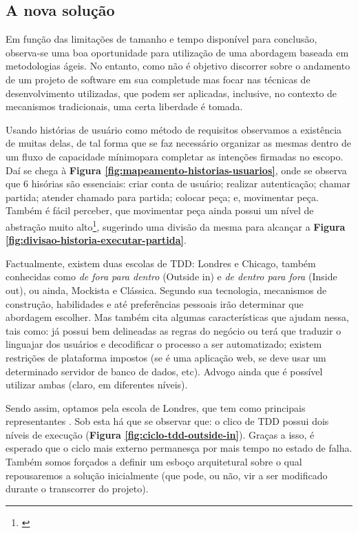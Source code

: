 \subsection{A nova solução}

  Em função das limitações de tamanho e tempo disponível para conclusão,
  observa-se uma boa oportunidade para utilização de uma abordagem baseada em
  metodologias ágeis. No entanto, como não é objetivo discorrer sobre o
  andamento de um projeto de software em sua completude mas focar nas técnicas
  de desenvolvimento utilizadas, que podem ser aplicadas, inclusive, no contexto
  de mecanismos tradicionais, uma certa liberdade é tomada.

  Usando histórias de usuário como método de requisitos observamos a existência
  de muitas delas, de tal forma que se faz necessário organizar as mesmas dentro
  de um fluxo de capacidade mínimo\footnotemark para completar as intenções
  firmadas no escopo. Daí se chega à \textbf{Figura
  \ref{fig:mapeamento-historias-usuarios}}, onde se observa que 6 hisórias são essenciais: criar
  conta de usuário; realizar autenticação; chamar partida; atender chamado para
  partida; colocar peça; e, movimentar peça. Também é fácil perceber, que movimentar peça
  ainda possui um nível de abstração muito alto\footnote{\cite[pág. 23]
  {Cohn2004}}, sugerindo uma divisão da mesma para alcançar a \textbf{Figura
  \ref{fig:divisao-historia-executar-partida}}.

  Factualmente, existem duas escolas de TDD: Londres e Chicago, também conhecidas
  como \emph{de fora para dentro} (Outside in) e \emph{de dentro para fora}
  (Inside out), ou ainda, Mockista e Clássica. Segundo  sua tecnologia, mecanismos de construção, habilidades e até
  preferências pessoais irão determinar que abordagem escolher. Mas também cita
  algumas características que ajudam nessa, tais como: já possui bem delineadas
  as regras do negócio ou terá que traduzir o linguajar dos usuários e decodificar
  o processo a ser automatizado; existem restrições de plataforma impostos (se é
  uma aplicação web, se deve usar um determinado servidor de banco de dados, etc).
  Advogo ainda que é possível utilizar ambas (claro, em diferentes níveis).

  Sendo assim, optamos pela escola de Londres, que tem como principais
  representantes . Sob esta há que se observar que:
  o clico de TDD possui dois níveis de execução (\textbf{Figura \ref{fig:ciclo-tdd-outside-in}}).
  Graças a isso, é esperado que o ciclo mais externo permanesça por mais tempo
  no estado de falha. Também somos forçados a definir um esboço arquitetural
  sobre o qual repousaremos a solução inicialmente (que pode, ou não, vir a ser
  modificado durante o transcorrer do projeto).

